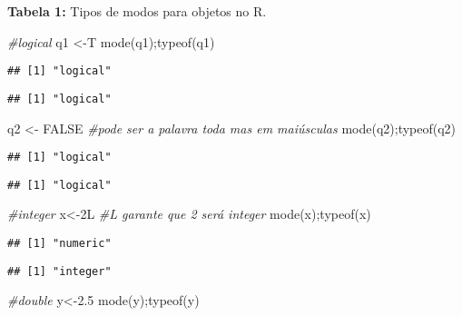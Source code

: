 \documentclass[
]{book}
\newenvironment{Shaded}{\begin{snugshade}}{\end{snugshade}}
\newcommand{\CommentTok}[1]{\textcolor[rgb]{0.56,0.35,0.01}{\textit{#1}}}
\newcommand{\ConstantTok}[1]{\textcolor[rgb]{0.00,0.00,0.00}{#1}}
\newcommand{\FloatTok}[1]{\textcolor[rgb]{0.00,0.00,0.81}{#1}}
\newcommand{\FunctionTok}[1]{\textcolor[rgb]{0.00,0.00,0.00}{#1}}
\newcommand{\NormalTok}[1]{#1}
\newcommand{\OtherTok}[1]{\textcolor[rgb]{0.56,0.35,0.01}{#1}}
\begin{document}
\textbf{Tabela 1:} Tipos de modos para objetos no R.

\begin{Shaded}
\begin{Highlighting}[]
\CommentTok{\#logical}
\NormalTok{q1 }\OtherTok{\textless{}{-}}\NormalTok{T}
\FunctionTok{mode}\NormalTok{(q1);}\FunctionTok{typeof}\NormalTok{(q1)}
\end{Highlighting}
\end{Shaded}

\begin{verbatim}
## [1] "logical"
\end{verbatim}

\begin{verbatim}
## [1] "logical"
\end{verbatim}

\begin{Shaded}
\begin{Highlighting}[]
\NormalTok{q2 }\OtherTok{\textless{}{-}} \ConstantTok{FALSE} \CommentTok{\#pode ser a palavra toda mas em maiúsculas }
\FunctionTok{mode}\NormalTok{(q2);}\FunctionTok{typeof}\NormalTok{(q2)}
\end{Highlighting}
\end{Shaded}

\begin{verbatim}
## [1] "logical"
\end{verbatim}

\begin{verbatim}
## [1] "logical"
\end{verbatim}

\begin{Shaded}
\begin{Highlighting}[]
\CommentTok{\#integer}
\NormalTok{x}\OtherTok{\textless{}{-}}\NormalTok{2L }\CommentTok{\#L garante que 2 será integer}
\FunctionTok{mode}\NormalTok{(x);}\FunctionTok{typeof}\NormalTok{(x)}
\end{Highlighting}
\end{Shaded}

\begin{verbatim}
## [1] "numeric"
\end{verbatim}

\begin{verbatim}
## [1] "integer"
\end{verbatim}

\begin{Shaded}
\begin{Highlighting}[]
\CommentTok{\#double}
\NormalTok{y}\OtherTok{\textless{}{-}}\FloatTok{2.5}
\FunctionTok{mode}\NormalTok{(y);}\FunctionTok{typeof}\NormalTok{(y)}
\end{Highlighting}
\end{Shaded}
\end{document}
